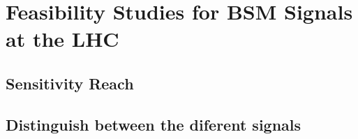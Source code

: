 \chapter{Feasibility Studies for BSM Signals at the LHC}

\section{Sensitivity Reach}

\section{Distinguish between the diferent signals}
